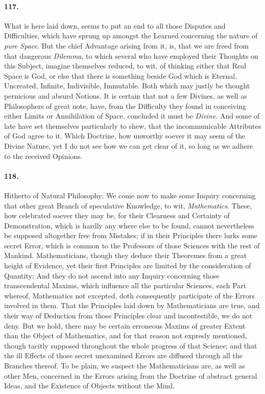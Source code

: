 \documentclass[]{article}
\newenvironment{sectionbody}{\begin{multicols}{2}}{\end{multicols}}
\begin{document}
\begin{sectionbody}
\paragraph{117.} What is here laid down, seems to put an end to all those Disputes
and Difficulties, which have sprung up amongst the Learned
concerning the nature of \emph{pure Space}.  But the chief
Advantage arising from it, is, that we are freed from that
dangerous \emph{Dilemma}, to which several who have employed
their Thoughts on this Subject, imagine themselves reduced, to
wit, of thinking either that Real Space is {\sc God}, or else that
there is something beside {\sc God} which is Eternal, Uncreated,
Infinite, Indivisible, Immutable.  Both which may justly be
thought pernicious and absurd Notions.  It is certain that not a
few Divines, as well as Philosophers of great note, have, from
the Difficulty they found in conceiving either Limits or
Annihilation of Space, concluded it must be \emph{Divine}.  And
some of late have set themselves particularly to shew, that the
incommunicable Attributes of {\sc God} agree to it.  Which Doctrine,
how unworthy soever it may seem of the Divine Nature, yet I do
not see how we can get clear of it, so long as we adhere to the
received Opinions.



\paragraph{118.} Hitherto of Natural Philosophy: We come now to make some Inquiry
concerning that other great Branch of speculative Knowledge, to
wit, \emph{Mathematics}.  These, how celebrated soever they may
be, for their Clearness and Certainty of Demonstration, which is
hardly any where else to be found, cannot nevertheless be
supposed altogether free from Mistakes; if in their Principles
there lurks some secret Error, which is common to the Professors
of those Sciences with the rest of Mankind.  Mathematicians,
though they deduce their Theoremes from a great height of
Evidence, yet their first Principles are limited by the
consideration of Quantity: And they do not ascend into any
Inquiry concerning those transcendental Maxims, which influence
all the particular Sciences, each Part whereof, Mathematics not
excepted, doth consequently participate of the Errors involved in
them.  That the Principles laid down by Mathematicians are true,
and their way of Deduction from those Principles clear and
incontestible, we do not deny.  But we hold, there may be certain
erroneous Maxims of greater Extent than the Object of
Mathematics, and for that reason not expresly mentioned, though
tacitly supposed throughout the whole progress of that Science;
and that the ill Effects of those secret unexamined Errors are
diffused through all the Branches thereof.  To be plain, we
suspect the Mathematicians are, as well as other Men, concerned
in the Errors arising from the Doctrine of abstract general
Ideas, and the Existence of Objects without the Mind.




\end{sectionbody}
\end{document}
